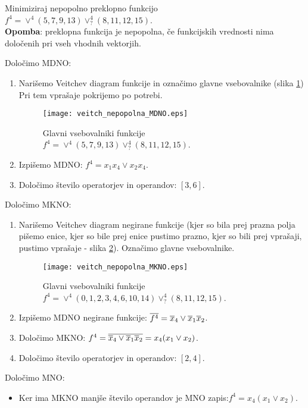 \begin{zgled}
Minimiziraj nepopolno preklopno funkcijo $f^4 = \vee^4(5,7,9,13) \vee^4_? (8,11,12,15)$.\\

\textbf{Opomba}: preklopna funkcija je nepopolna, če funkcijskih vrednosti nima določenih pri vseh vhodnih vektorjih.\\
\end{zgled}
\begin{resitev}

Določimo MDNO:

\begin{enumerate}
\item Narišemo Veitchev diagram funkcije in označimo glavne vsebovalnike (slika \ref{fig:Veitch_nepopolna_MDNO}) Pri tem vprašaje pokrijemo po potrebi.
\begin{figure}[ht]
\begin{center}
	\texttt{[image: veitch\_nepopolna\_MDNO.eps]}
\end{center}
\caption{Glavni vsebovalniki funkcije $f^4 = \vee^4(5,7,9,13) \vee^4_? (8,11,12,15)$.}
\label{fig:Veitch_nepopolna_MDNO}
\end{figure}
\item Izpišemo MDNO: $f^4=x_1 x_4 \vee x_2 x_4$.
\item  Določimo število operatorjev in operandov: $[3,6]$.
\end{enumerate}

Določimo MKNO:
\begin{enumerate}
\item Narišemo Veitchev diagram negirane funkcije (kjer so bila prej prazna polja pišemo enice, kjer so bile prej enice pustimo prazno, kjer so bili prej vprašaji, pustimo vprašaje - slika \ref{fig:Veitch_nepopolna_MKNO}). Označimo glavne vsebovalnike.
\begin{figure}[ht]
\begin{center}
	\texttt{[image: veitch\_nepopolna\_MKNO.eps]}
\end{center}
\caption{Glavni vsebovalniki funkcije $f^4 = \vee^4(0,1,2,3,4,6,10,14) \vee^4_? (8,11,12,15)$.}
\label{fig:Veitch_nepopolna_MKNO}
\end{figure}
\item Izpišemo MDNO negirane funkcije: $\overline{f^4}=\overline x_4 \vee \overline x_1 \overline x_2$.
\item Določimo MKNO: $f^4=\overline{\overline x_4 \vee \overline x_1 \overline x_2}=x_4(x_1 \vee x_2)$.
\item Določimo število operatorjev in operandov: $[2,4]$.
\end{enumerate}

Določimo MNO:
\begin{itemize}
\item Ker ima MKNO manjše število operandov je MNO zapis:$f^4=x_4(x_1 \vee x_2)$.
\end{itemize}

\end{resitev}